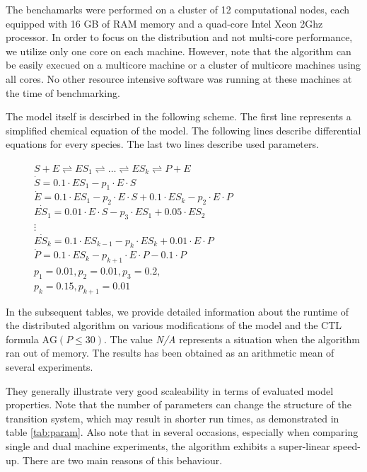 \documentclass[12pt,oneside, draft]{fithesis2}
\newcommand{\ag}[1]{\ensuremath{\mbox{AG} #1}}
\begin{document}
				
				The benchamarks were performed on a cluster of 12 computational nodes, each equipped with 16 GB of RAM memory and a quad-core Intel Xeon 2Ghz processor. In order to focus on the distribution and not multi-core performance, we utilize only one core on each machine. However, note that the algorithm can be easily execued on a multicore machine or a cluster of multicore machines using all cores. No other resource intensive software was running at these machines at the time of benchmarking.
				
				The model itself is descirbed in the following scheme. The first line represents a simplified chemical equation of the model. The following lines describe differential equations for every species. The last two lines describe used parameters. 				


				\begin{figure}
					\centering
					\underline{$S + E \rightleftharpoons ES_1 \rightleftharpoons \dots \rightleftharpoons ES_k \rightleftharpoons P + E$}\\
					$\dot{S}  =  0.1\cdot ES_1 - p_1\cdot E\cdot S$\\
					$\dot{E}  =  0.1\cdot ES_1 - p_2\cdot E\cdot S + 0.1\cdot ES_k - p_2\cdot E\cdot P$\\
					$\dot{ES_1} = 0.01\cdot E\cdot S - p_3\cdot ES_1 + 0.05\cdot ES_2$\\
					$\vdots $\\
					$\dot{ES_k} = 0.1\cdot ES_{k -1} - p_k\cdot ES_k + 0.01\cdot E\cdot P$\\
					\underline{$\dot{P}  =  0.1\cdot ES_k - p_{k+1}\cdot E\cdot P - 0.1\cdot P$}\\
					$p_1 = 0.01, p_2 = 0.01, p_3 = 0.2,$\\ $p_k = 0.15, p_{k+1} = 0.01$
				\end{figure}


				In the subsequent tables, we provide detailed information about the runtime of the distributed algorithm on various modifications of the model and the CTL formula $\ag{(P \leq 30)}$.  The value {\em N/A} represents a situation when the algorithm ran out of memory. The results has been obtained as an arithmetic mean of several experiments.
				
				They generally illustrate very good scaleability in terms of evaluated model properties. Note that the number of parameters can change the structure of the transition system, which may result in shorter run times, as demonstrated in table \ref{tab:param}. Also note that in several occasions, especially when comparing single and dual machine experiments, the algorithm exhibits a super-linear speed-up. There are two main reasons of this behaviour. 
				
\end{document}

